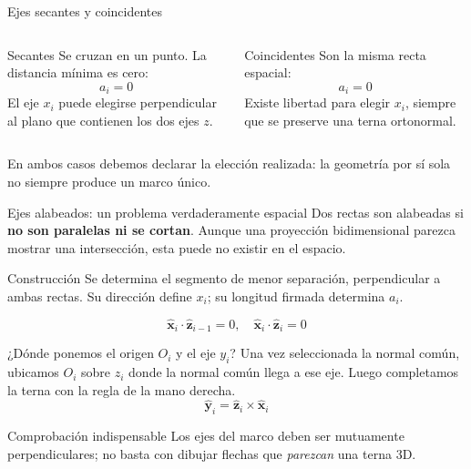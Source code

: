 \documentclass[aspectratio=169,11pt]{beamer}
\begin{document}
\begin{frame}[t]{Ejes secantes y coincidentes}
 \small
 \begin{columns}[T,onlytextwidth]
  \begin{block}{Secantes}
   Se cruzan en un punto. La distancia mínima es cero:
   \[\boxed{a_i=0}\]
   El eje $x_i$ puede elegirse perpendicular al plano
   que contienen los dos ejes $z$.
  \end{block}
  \begin{block}{Coincidentes}
   Son la misma recta espacial:
   \[\boxed{a_i=0}\]
   Existe libertad para elegir $x_i$, siempre que se preserve
   una terna ortonormal.
  \end{block}
 \end{columns}
 \pause
 \vspace{0.18cm}
 \small En ambos casos debemos declarar la elección realizada:
 la geometría por sí sola no siempre produce un marco único.
\end{frame}

\begin{frame}[t]{Ejes alabeados: un problema verdaderamente espacial}
 \small
 Dos rectas son alabeadas si \textbf{no son paralelas ni se cortan}.
 Aunque una proyección bidimensional parezca mostrar una intersección,
 esta puede no existir en el espacio.
 \pause
 \begin{block}{Construcción}
 Se determina el segmento de menor separación, perpendicular a ambas
 rectas. Su dirección define $x_i$; su longitud firmada determina $a_i$.
 \end{block}
 \[
 \boxed{\hat{\mathbf x}_i\cdot\hat{\mathbf z}_{i-1}=0,
 \quad\hat{\mathbf x}_i\cdot\hat{\mathbf z}_{i}=0}
 \]
\end{frame}

\begin{frame}[t]{¿Dónde ponemos el origen $O_i$ y el eje $y_i$?}
 \small
 Una vez seleccionada la normal común, ubicamos $O_i$
 sobre $z_i$ donde la normal común llega a ese eje.
 Luego completamos la terna con la regla de la mano derecha.
 \pause
 \[
 \boxed{\hat{\mathbf y}_i=
        \hat{\mathbf z}_i\times\hat{\mathbf x}_i}
 \]
 \pause
 \begin{alertblock}{Comprobación indispensable}
 Los ejes del marco deben ser mutuamente perpendiculares;
 no basta con dibujar flechas que \emph{parezcan} una terna 3D.
 \end{alertblock}
\end{frame}
\end{document}
